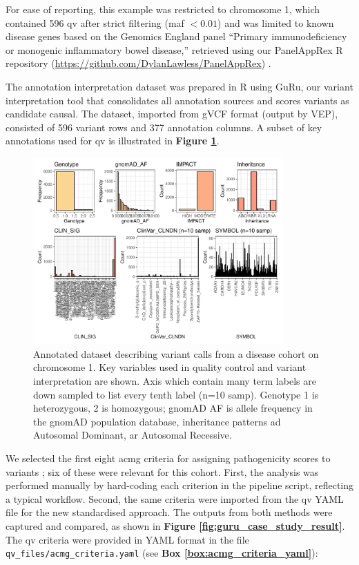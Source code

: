 For ease of reporting, this example was restricted to chromosome 1, which contained 596 \ac{qv} after strict filtering (\ac{maf} $< 0.01$) and was limited to known disease genes based on the Genomics England panel ``Primary immunodeficiency or monogenic inflammatory bowel disease,'' retrieved using our PanelAppRex R repository (\url{https://github.com/DylanLawless/PanelAppRex}) 
\cite{lawless_panelapprex_2025}.

The annotation interpretation dataset was prepared in R using GuRu, our variant interpretation tool that consolidates all annotation sources and scores variants as candidate causal. The dataset, imported from gVCF format (output by VEP), consisted of 596 variant rows and 377 annotation columns. A subset of key annotations used for \ac{qv} is illustrated in \textbf{Figure \ref{fig:guru_case_study_setup}}.

\begin{figure}[!h]
    \centering
   \includegraphics[width=0.85\textwidth]{./images/Guru_singlecase_distribution_variables.pdf}
       \caption{Annotated dataset describing variant calls from a disease cohort on chromosome 1. Key variables used in quality control and variant interpretation are shown. Axis which contain many term labels are down sampled to list every tenth  label (n=10 samp). Genotype 1 is heterozygous, 2 is homozygous; gnomAD AF is allele frequency in the gnomAD population database, inheritance patterns \ac{ad} Autosomal Dominant, \ac{ar} Autosomal Recessive.}
    \label{fig:guru_case_study_setup}
\end{figure}
\FloatBarrier

We selected the first eight \ac{acmg} criteria for assigning pathogenicity scores to variants \cite{richards2015standards}; six of these were relevant for this cohort. First, the analysis was performed manually by hard-coding each criterion in the pipeline script, reflecting a typical workflow. Second, the same criteria were imported from the \ac{qv} YAML file for the new standardised approach. The outputs from both methods were captured and compared, as shown in \textbf{Figure \ref{fig:guru_case_study_result}}. The \ac{qv} criteria were provided in YAML format in the file \texttt{qv\_files/acmg\_criteria.yaml} (see \textbf{Box \ref{box:acmg_criteria_yaml}}):

